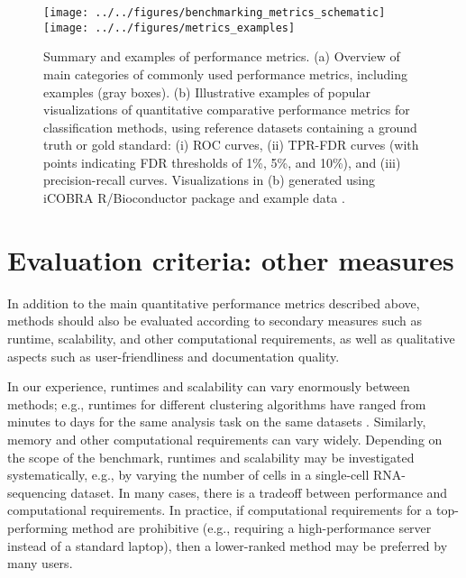 \documentclass[12pt, a4paper]{article}
\begin{document}

\vskip 5mm

\begin{figure}[H]
\begin{center}
\texttt{[image: ../../figures/benchmarking\_metrics\_schematic]}
\texttt{[image: ../../figures/metrics\_examples]}
\end{center}
\caption{Summary and examples of performance metrics. (a) Overview of main categories of commonly used performance metrics, including examples (gray boxes). (b) Illustrative examples of popular visualizations of quantitative comparative performance metrics for classification methods, using reference datasets containing a ground truth or gold standard: (i) ROC curves, (ii) TPR-FDR curves (with points indicating FDR thresholds of 1\%, 5\%, and 10\%), and (iii) precision-recall curves. Visualizations in (b) generated using iCOBRA R/Bioconductor package and example data \citep{Soneson2016}.}
\label{fig:metrics}
\end{figure}




\section*{Evaluation criteria: other measures}

In addition to the main quantitative performance metrics described above, methods should also be evaluated according to secondary measures such as runtime, scalability, and other computational requirements, as well as qualitative aspects such as user-friendliness and documentation quality.

In our experience, runtimes and scalability can vary enormously between methods; e.g., runtimes for different clustering algorithms have ranged from minutes to days for the same analysis task on the same datasets \citep{Weber2016}. Similarly, memory and other computational requirements can vary widely. Depending on the scope of the benchmark, runtimes and scalability may be investigated systematically, e.g., by varying the number of cells in a single-cell RNA-sequencing dataset. In many cases, there is a tradeoff between performance and computational requirements. In practice, if computational requirements for a top-performing method are prohibitive (e.g., requiring a high-performance server instead of a standard laptop), then a lower-ranked method may be preferred by many users.
\end{document}
